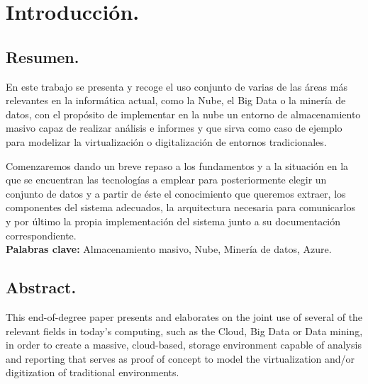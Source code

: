 \documentclass[11pt, a4paper]{article} %
\begin{document}
\lstset{language=R,texcl=true,basicstyle=\small,showspaces=false,} %
\begin{titlepage}
\newlength{\originalVOffset}
\newlength{\originalHOffset}
\setlength{\originalVOffset}{\voffset}   
\setlength{\originalHOffset}{\hoffset}
\setlength{\voffset}{0cm}
\setlength{\hoffset}{0cm}

\setlength{\voffset}{\originalVOffset}
\setlength{\hoffset}{\originalHOffset}
\end{titlepage}
\setlength{\originalVOffset}{\voffset}   
\setlength{\originalHOffset}{\hoffset}
\setlength{\voffset}{0cm}
\setlength{\hoffset}{0cm}

\setlength{\voffset}{\originalVOffset}
\setlength{\hoffset}{\originalHOffset}

\tableofcontents	  %

\setlength{\parindent}{0em}
\setlength{\parskip}{1em}
\newpage
\section{Introducción.}
\subsection{Resumen.}
En este trabajo se presenta y recoge el uso conjunto de varias de las áreas más relevantes en la informática actual, como la Nube, el Big Data o la minería de datos, con el propósito de implementar en la nube un entorno de almacenamiento masivo capaz de realizar análisis e informes y que sirva como caso de ejemplo para modelizar la virtualización o digitalización de entornos tradicionales.


Comenzaremos dando un breve repaso a los fundamentos y a la situación en la que se encuentran las tecnologías a emplear para posteriormente elegir un conjunto de datos y a partir de éste el conocimiento que queremos extraer, los componentes del sistema adecuados, la arquitectura necesaria para comunicarlos y por último la propia implementación del sistema junto a su documentación correspondiente.
\vspace{1cm} \ \\
\textbf{Palabras clave:} Almacenamiento masivo, Nube, Minería de datos, Azure.
\newpage
\subsection{Abstract.}
This end-of-degree paper presents and elaborates on the joint use of several of the relevant fields in today's computing, such as the Cloud, Big Data or Data mining, in order to create a massive, cloud-based, storage environment capable of analysis and reporting that serves as proof of concept to model the virtualization and/or digitization of traditional environments.
\end{document}
